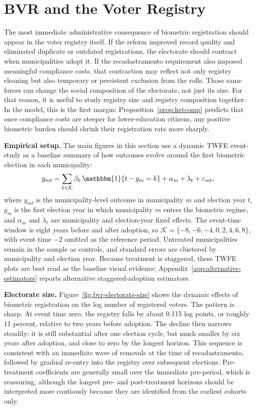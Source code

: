 \section{BVR and the Voter Registry}
\label{sec:electorate-size}
\label{sec:electorate-composition}

The most immediate administrative consequence of biometric registration should appear in the voter registry itself. If the reform improved record quality and eliminated duplicate or outdated registrations, the electorate should contract when municipalities adopt it. If the recadastramento requirement also imposed meaningful compliance costs, that contraction may reflect not only registry cleaning but also temporary or persistent exclusion from the rolls. Those same forces can change the social composition of the electorate, not just its size. For that reason, it is useful to study registry size and registry composition together. In the model, this is the first margin: Proposition~\ref{prop:hetcomp} predicts that once compliance costs are steeper for lower-education citizens, any positive biometric burden should shrink their registration rate more sharply.

\textbf{Empirical setup.} The main figures in this section use a dynamic TWFE event-study as a baseline summary of how outcomes evolve around the first biometric election in each municipality:
\begin{equation}
\label{eq:twfe-electorate}
y_{mt} = \sum_{k \in \mathcal{K}} \beta_k \, \mathbbm{1}\{t - g_m = k\} + \alpha_m + \lambda_t + \varepsilon_{mt},
\end{equation}
where $y_{mt}$ is the municipality-level outcome in municipality $m$ and election year $t$, $g_m$ is the first election year in which municipality $m$ enters the biometric regime, and $\alpha_m$ and $\lambda_t$ are municipality and election-year fixed effects. The event-time window is eight years before and after adoption, so $\mathcal{K}=\{-8,-6,-4,0,2,4,6,8\}$, with event time $-2$ omitted as the reference period. Untreated municipalities remain in the sample as controls, and standard errors are clustered by municipality and election year. Because treatment is staggered, these TWFE plots are best read as the baseline visual evidence; Appendix~\ref{app:alternative-estimators} reports alternative staggered-adoption estimators.

\textbf{Electorate size.} Figure~\ref{fig:bvr-electorate-size} shows the dynamic effects of biometric registration on the log number of registered voters. The pattern is sharp. At event time zero, the registry falls by about 0.115 log points, or roughly 11 percent, relative to two years before adoption. The decline then narrows steadily: it is still substantial after one election cycle, but much smaller by six years after adoption, and close to zero by the longest horizon. This sequence is consistent with an immediate wave of removals at the time of recadastramento, followed by gradual re-entry into the registry over subsequent elections. Pre-treatment coefficients are generally small over the immediate pre-period, which is reassuring, although the longest pre- and post-treatment horizons should be interpreted more cautiously because they are identified from the earliest cohorts only.

